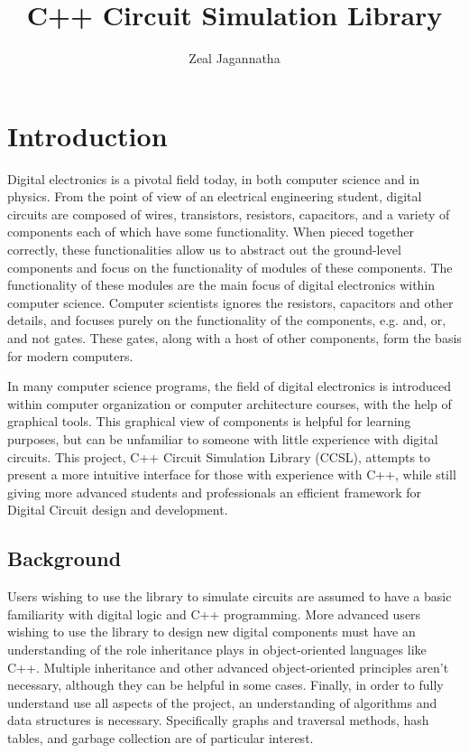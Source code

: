 \documentclass{article}
\begin{document}
    \title{C++ Circuit Simulation Library}
    \author{Zeal Jagannatha}

\maketitle

\section{Introduction}

Digital electronics is a pivotal field today, in both computer science and in physics. From the point of view of an electrical engineering student, digital circuits are composed of wires, transistors, resistors, capacitors, and a variety of components each of which have some functionality. When pieced together correctly, these functionalities allow us to abstract out the ground-level components and focus on the functionality of modules of these components. The functionality of these modules are the main focus of digital electronics within computer science. Computer scientists ignores the resistors, capacitors and other details, and focuses purely on the functionality of the components, e.g. and, or, and not gates. These gates, along with a host of other components, form the basis for modern computers.

In many computer science programs, the field of digital electronics is introduced within computer organization or computer architecture courses, with the help of graphical tools. This graphical view of components is helpful for learning purposes, but can be unfamiliar to someone with little experience with digital circuits. This project, C++ Circuit Simulation Library (CCSL), attempts to present a more intuitive interface for those with experience with C++, while still giving more advanced students and professionals an efficient framework for Digital Circuit design and development.

\subsection{Background}

Users wishing to use the library to simulate circuits are assumed to have a basic familiarity with digital logic and C++ programming. More advanced users wishing to use the library to design new digital components must have an understanding of the role inheritance plays in object-oriented languages like C++. Multiple inheritance and other advanced object-oriented principles aren’t necessary, although they can be helpful in some cases. Finally, in order to fully understand use all aspects of the project, an understanding of algorithms and data structures is necessary. Specifically graphs and traversal methods, hash tables, and garbage collection are of particular interest.
\end{document}
